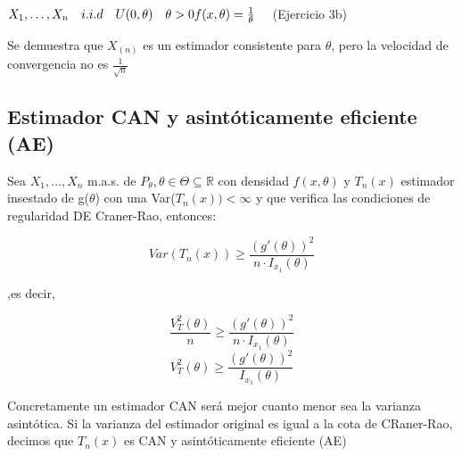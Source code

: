 \(
X_1,\dots,X_n \quad i.i.d \quad U(0,\theta) \quad \theta>0
\\f(x,\theta)= \frac{1}{\theta} \quad
\)
(Ejercicio 3b)

Se demuestra que $X_{(n)}$ es un estimador consistente para $\theta$, pero la velocidad de convergencia no es $\frac{1}{\sqrt{n}}$

\subsection{Estimador CAN y asintóticamente eficiente (AE)}

Sea $X_1,\dots,X_n$ m.a.s. de $P_\theta, \theta \in \Theta \subseteq \mathbb{R}$
 con densidad $f(x,\theta)$ y $T_n(x)$ estimador insestado de g($\theta$) con una Var($T_n(x))<\infty$
 y que verifica las condiciones de regularidad DE Craner-Rao, entonces:

\[
Var(T_n(x)) \geq \frac{(g'(\theta))^2}{n \cdot I_{x_1}(\theta)}
\]

,es decir,

\[
\frac{V_T^2(\theta)}{n} \geq \frac{(g'(\theta))^2}{n \cdot I_{x_1}(\theta)}
\]
\[
V_T^2(\theta) \geq \frac{(g'(\theta))^2}{I_{x_1}(\theta)}
\]

Concretamente un estimador CAN será mejor cuanto menor sea la varianza asintótica. 
Si la varianza del estimador original es igual a la cota de CRaner-Rao, decimos que $T_n(x)$ es CAN y asintóticamente eficiente (AE)






